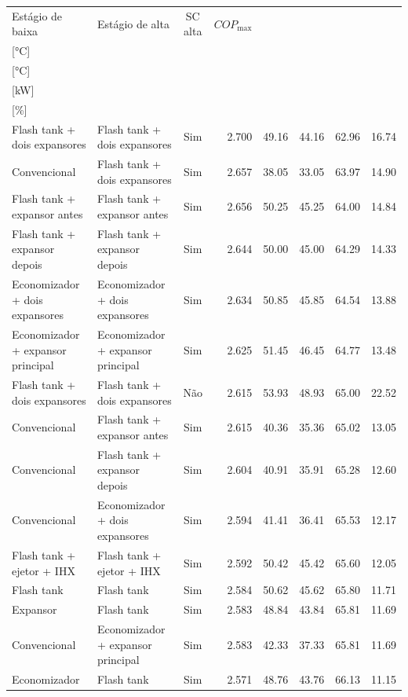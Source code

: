 {\small\setlength{\tabcolsep}{4pt}\renewcommand{\arraystretch}{1.12}
\begin{tabular}{llcrrrrr}
\toprule
Estágio de baixa & Estágio de alta & SC alta & $COP_{\max}$ & \shortstack{$T_{\mathrm{cond,l}}^*$\\{[°C]}} & \shortstack{$T_{\mathrm{evap,h}}^*$\\{[°C]}} & \shortstack{$\dot W_{\mathrm{liq}}$\\{[kW]}} & \shortstack{$\Delta COP_{\mathrm{opt}}$\\{[\%]}} \\
\midrule
Flash tank + dois expansores & Flash tank + dois expansores & Sim & 2.700 & 49.16 & 44.16 & 62.96 & 16.74 \\
Convencional & Flash tank + dois expansores & Sim & 2.657 & 38.05 & 33.05 & 63.97 & 14.90 \\
Flash tank + expansor antes & Flash tank + expansor antes & Sim & 2.656 & 50.25 & 45.25 & 64.00 & 14.84 \\
Flash tank + expansor depois & Flash tank + expansor depois & Sim & 2.644 & 50.00 & 45.00 & 64.29 & 14.33 \\
Economizador + dois expansores & Economizador + dois expansores & Sim & 2.634 & 50.85 & 45.85 & 64.54 & 13.88 \\
Economizador + expansor principal & Economizador + expansor principal & Sim & 2.625 & 51.45 & 46.45 & 64.77 & 13.48 \\
Flash tank + dois expansores & Flash tank + dois expansores & Não & 2.615 & 53.93 & 48.93 & 65.00 & 22.52 \\
Convencional & Flash tank + expansor antes & Sim & 2.615 & 40.36 & 35.36 & 65.02 & 13.05 \\
Convencional & Flash tank + expansor depois & Sim & 2.604 & 40.91 & 35.91 & 65.28 & 12.60 \\
Convencional & Economizador + dois expansores & Sim & 2.594 & 41.41 & 36.41 & 65.53 & 12.17 \\
Flash tank + ejetor + IHX & Flash tank + ejetor + IHX & Sim & 2.592 & 50.42 & 45.42 & 65.60 & 12.05 \\
Flash tank & Flash tank & Sim & 2.584 & 50.62 & 45.62 & 65.80 & 11.71 \\
Expansor & Flash tank & Sim & 2.583 & 48.84 & 43.84 & 65.81 & 11.69 \\
Convencional & Economizador + expansor principal & Sim & 2.583 & 42.33 & 37.33 & 65.81 & 11.69 \\
Economizador & Flash tank & Sim & 2.571 & 48.76 & 43.76 & 66.13 & 11.15 \\

\end{tabular}}
